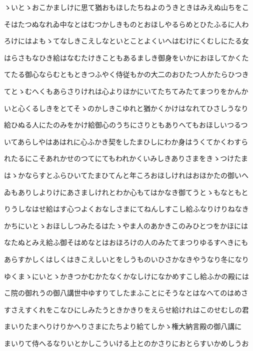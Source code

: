 \documentclass[a4paper,11pt,landscape]{ltjtarticle}
\begin{document}
\par\medskip
ゝいとゝおこかましけに思て猶おもほしたちねよのうきときはみえぬ山ちをこ
\par\medskip
そはたつぬなれゐ中なとはむつかしきものとおほしやるらめとひたふるに人わ
\par\medskip
ろけにはよもゝてなしきこえしなといとことよくいへはむけにくむしにたる女
\par\medskip
はらさもなひき給はなむたけきこともあるましき御身をいかにおほしてかくた
\par\medskip
てたる御心ならむともときつふやく侍従もかの大二のおひたつ人かたらひつき
\par\medskip
てとゝむへくもあらさりけれは心よりほかにいてたちてみたてまつりをかんか
\par\medskip
いと心くるしきをとてそゝのかしきこゆれと猶かくかけはなれてひさしうなり
\par\medskip
給ひぬる人にたのみをかけ給御心のうちにさりともありへてもおほしいつるつ
\par\medskip
いてあらしやはあはれに心ふかき契をしたまひしにわか身はうくてかくわすら
\par\medskip
れたるにこそあれかせのつてにてもわれかくいみしきありさまをきゝつけたま
\par\medskip
はゝかならすとふらひいてたまひてんと年ころおほしけれはおほかたの御いへ
\par\medskip
ゐもありしよりけにあさましけれとわか心もてはかなき御てうとゝもなともと
\par\medskip
りうしなはせ給はす心つよくおなしさまにてねんしすこし給ふなりけりねなき
\par\medskip
かちにいとゝおほししつみたるはたゝやま人のあかきこのみひとつをかほには
\par\medskip
なたぬとみえ給ふ御そはめなとはおほろけの人のみたてまつりゆるすへきにも
\par\medskip
あらすかしくはしくはきこえしいとをしうものいひさかなきやうなり冬になり
\par\medskip
ゆくまゝにいとゝかきつかむかたなくかなしけになかめすこし給ふかの殿には
\par\medskip
こ院の御れうの御八講世中ゆすりてしたまふことにそうなとはなへてのはめさ
\par\medskip
すさえすくれをこなひにしみたうときかきりをえらせ給けれはこのせむしの君
\par\medskip
まいりたまへりけりかへりさまにたちより給てしかゝ権大納言殿の御八講に
\par\medskip
まいりて侍へるなりいとかしこういける上とのかさりにおとらすいかめしうお
\end{document}
